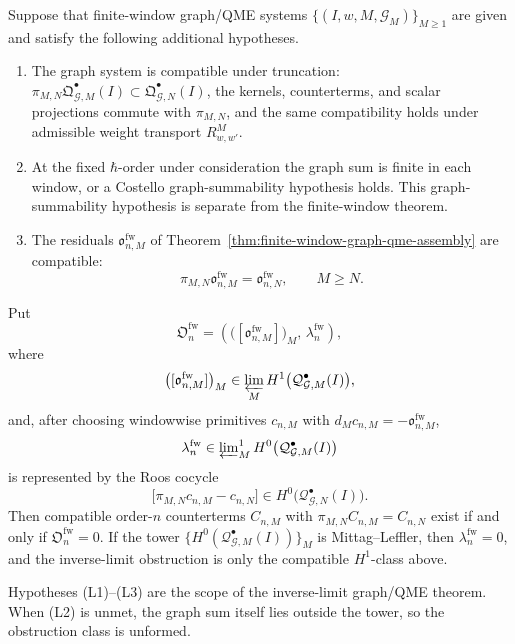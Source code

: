 \begin{prop}\label{prop:finite-window-qme-limit-condition}
  Suppose that finite-window graph/QME systems
  \(\{(I,w,M,\mathcal G_M)\}_{M\geq1}\) are given and satisfy the
  following additional hypotheses.
  \begin{enumerate}[label=(L\arabic*)]
    \item The graph system is compatible under truncation:
    \(\pi_{M,N}\mathfrak Q^\bullet_{\mathcal G,M}(I)\subset
    \mathfrak Q^\bullet_{\mathcal G,N}(I)\), the kernels, counterterms,
    and scalar projections commute with \(\pi_{M,N}\), and the same
    compatibility holds under admissible weight transport \(R^M_{w,w'}\).
    \item At the fixed \(\hbar\)-order under consideration the graph sum is
    finite in each window, or a Costello graph-summability hypothesis
    holds.  This graph-summability hypothesis is separate
    from the finite-window theorem.
    \item The residuals
    \(\mathfrak o^{\mathrm{fw}}_{n,M}\) of
    Theorem~\ref{thm:finite-window-graph-qme-assembly} are compatible:
    \[
      \pi_{M,N}\mathfrak o^{\mathrm{fw}}_{n,M}
        =
      \mathfrak o^{\mathrm{fw}}_{n,N},
      \qquad M\geq N.
    \]
  \end{enumerate}
  Put
  \[
    \mathfrak O^{\mathrm{fw}}_n
      =
    \left(
      \bigl([\mathfrak o^{\mathrm{fw}}_{n,M}]\bigr)_M,\,
      \lambda^{\mathrm{fw}}_n
    \right),
  \]
  where
  \[
    \bigl([\mathfrak o^{\mathrm{fw}}_{n,M}]\bigr)_M
      \in
    \varprojlim_M
    H^1\bigl(\mathcal Q^\bullet_{\mathcal G,M}(I)\bigr),
  \]
  and, after choosing windowwise primitives
  \(c_{n,M}\) with
  \(d_M c_{n,M}=-\mathfrak o^{\mathrm{fw}}_{n,M}\),
  \[
    \lambda^{\mathrm{fw}}_n\in
    \varprojlim\nolimits^1_M
    H^0\bigl(\mathcal Q^\bullet_{\mathcal G,M}(I)\bigr)
  \]
  is represented by the Roos cocycle
  \[
    \bigl[\pi_{M,N}c_{n,M}-c_{n,N}\bigr]\in
    H^0\bigl(\mathcal Q^\bullet_{\mathcal G,N}(I)\bigr).
  \]
  Then compatible order-\(n\) counterterms
  \(C_{n,M}\) with
  \(\pi_{M,N}C_{n,M}=C_{n,N}\) exist if and only if
  \(\mathfrak O^{\mathrm{fw}}_n=0\).  If the tower
  \(\{H^0(\mathcal Q^\bullet_{\mathcal G,M}(I))\}_M\) is
  Mittag--Leffler, then \(\lambda^{\mathrm{fw}}_n=0\), and the inverse-limit
  obstruction is only the compatible \(H^1\)-class above.

  Hypotheses (L1)--(L3) are the scope of the inverse-limit graph/QME
  theorem.  When (L2) is unmet, the graph sum itself lies outside the
  tower, so the obstruction class is unformed.
\end{prop}

